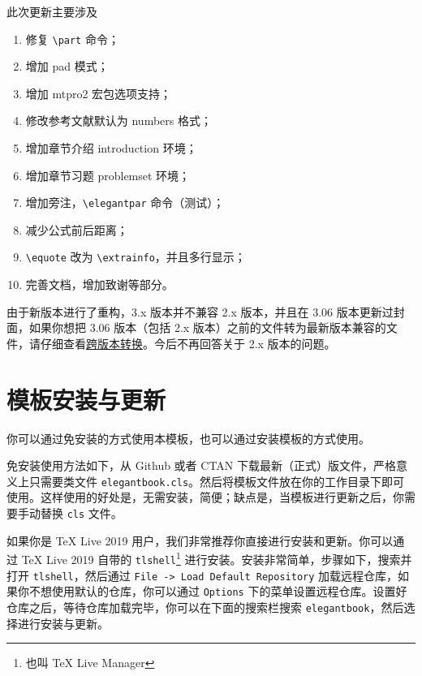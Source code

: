 	此次更新主要涉及
	\begin{enumerate}
	\item 修复 \lstinline|\part| 命令；
	\item 增加 pad 模式；
	\item 增加 mtpro2 宏包选项支持；
	\item 修改参考文献默认为 numbers 格式；
	\item 增加章节介绍 introduction 环境；
	\item 增加章节习题 problemset 环境；
	\item 增加旁注，\lstinline{\elegantpar} 命令（测试）；
	\item 减少公式前后距离；
	\item \lstinline{\equote} 改为 \lstinline{\extrainfo}，并且多行显示；
	\item 完善文档，增加致谢等部分。
	\end{enumerate}
	
	\begin{note}
	由于新版本进行了重构，3.x 版本并不兼容 2.x 版本，并且在 3.06 版本更新过封面，如果你想把 3.06 版本（包括 2.x 版本）之前的文件转为最新版本兼容的文件，请仔细查看\href{https://github.com/ElegantLaTeX/ElegantBook/wiki/convert}{跨版本转换}。今后不再回答关于 2.x 版本的问题。
	\end{note}

	\section{模板安装与更新}
	你可以通过免安装的方式使用本模板，也可以通过安装模板的方式使用。
	
	免安装使用方法如下，从 Github 或者 CTAN 下载最新（正式）版文件，严格意义上只需要类文件 \lstinline{elegantbook.cls}。然后将模板文件放在你的工作目录下即可使用。这样使用的好处是，无需安装，简便；缺点是，当模板进行更新之后，你需要手动替换 \lstinline{cls} 文件。
	
	如果你是 \TeX{} Live 2019 用户，我们非常推荐你直接进行安装和更新。你可以通过 \TeX{} Live 2019 自带的 \lstinline{tlshell}\footnote{也叫 \TeX{} Live Manager} 进行安装。安装非常简单，步骤如下，搜索并打开 \lstinline{tlshell}，然后通过 \lstinline{File -> Load Default Repository} 加载远程仓库，如果你不想使用默认的仓库，你可以通过 \lstinline{Options} 下的菜单设置远程仓库。设置好仓库之后，等待仓库加载完毕，你可以在下面的搜索栏搜索 \lstinline{elegantbook}，然后选择进行安装与更新。
	
